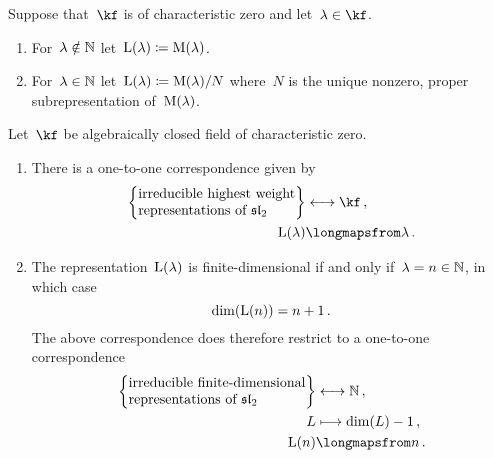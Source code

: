 \documentclass[a4paper, 11pt, oneside]{scrartcl}
\begin{document}
\begin{definition}
  Suppose that~$\kf$ is of characteristic zero and let~$\lambda \in \kf$.
  \begin{enumerate}
    \item
      For~$\lambda \notin \mathbb{N}$ let~$\operatorname{L}(\lambda) \coloneqq \operatorname{M}(\lambda)$.
    \item
      For~$\lambda \in \mathbb{N}$ let~$\operatorname{L}(\lambda) \coloneqq \operatorname{M}(\lambda)/N$ where~$N$ is the unique nonzero, proper subrepresentation of~$\operatorname{M}(\lambda)$.
  \end{enumerate}
\end{definition}

\begin{theorem}
  Let~$\kf$ be algebraically closed field of characteristic zero.
  \begin{enumerate}
    \item
      There is a one-to-one correspondence given by
      \begin{align*}
        \left\{
          \begin{tabular}{@{}l@{}}
            irreducible highest weight\\
            representations of~$\sllie_2$
          \end{tabular}
        \right\}
        &\longleftrightarrow
        \kf \,,
        \\
        \irred(\lambda)
        &\longmapsfrom
        \lambda \,.
      \end{align*}
    \item
      The representation~$\operatorname{L}(\lambda)$ is finite-dimensional if and only if~$\lambda = n \in \mathbb{N}$, in which case
      \[
        \dim(\operatorname{L}(n))
        =
        n + 1 \,.
      \]
      The above correspondence does therefore restrict to a one-to-one correspondence
      \begin{align*}
        \left\{
          \begin{tabular}{@{}l@{}}
            irreducible finite-dimensional\\
            representations of~$\sllie_2$
          \end{tabular}
        \right\}
        &\longleftrightarrow
        \Natural \,,
        \\
        L
        &\longmapsto
        \dim(L) - 1 \,,
        \\
        \irred(n)
        &\longmapsfrom
        n \,.
      \end{align*}
  \end{enumerate}
\end{theorem}
\end{document}
